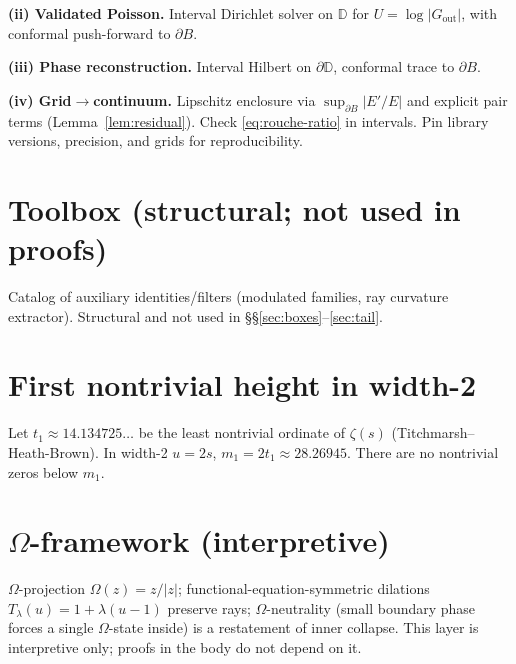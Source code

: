 \documentclass[11pt]{article}
\numberwithin{equation}{section}
\theoremstyle{remark}
\newcommand{\D}{\mathbb{D}}
\newcommand{\Gout}{G_{\mathrm{out}}}
\begin{document}
\noindent\textbf{(ii) Validated Poisson.} Interval Dirichlet solver on $\D$ for $U=\log|\Gout|$, with conformal push-forward to $\partial B$.
\smallskip

\noindent\textbf{(iii) Phase reconstruction.} Interval Hilbert on $\partial\D$, conformal trace to $\partial B$.
\smallskip

\noindent\textbf{(iv) Grid$\to$continuum.} Lipschitz enclosure via $\sup_{\partial B}|E'/E|$ and explicit pair terms (Lemma~\ref{lem:residual}). Check \eqref{eq:rouche-ratio} in intervals. Pin library versions, precision, and grids for reproducibility.

\section{Toolbox (structural; not used in proofs)}\label{app:toolbox}
Catalog of auxiliary identities/filters (modulated families, ray curvature extractor). Structural and not used in §§\ref{sec:boxes}--\ref{sec:tail}.

\section{First nontrivial height in width-2}\label{app:firstheight}
Let $t_1\approx 14.134725\ldots$ be the least nontrivial ordinate of $\zeta(s)$ (Titchmarsh--Heath-Brown). In width-2 $u=2s$, $m_1=2t_1\approx 28.26945$. There are no nontrivial zeros below $m_1$.

\section{$\Omega$-framework (interpretive)}\label{app:omega}
$\Omega$-projection $\Omega(z)=z/|z|$; functional-equation-symmetric dilations $T_\lambda(u)=1+\lambda(u-1)$ preserve rays; $\Omega$-neutrality (small boundary phase forces a single $\Omega$-state inside) is a restatement of inner collapse. This layer is interpretive only; proofs in the body do not depend on it.

\end{document}
